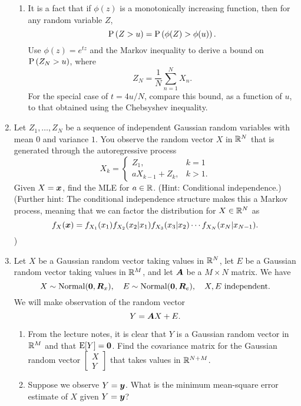 \documentclass[11pt]{article}
\begin{document}
\begin{enumerate}
\begin{enumerate}
	\item It is a fact that if $\phi(z)$ is a monotonically increasing function, then for any random variable $Z$,
	\[
		\P{Z > u} = \P{\phi(Z) >\phi(u)}. 
	\]
	Use $\phi(z) = e^{tz}$ and the Markov inequality to derive a bound on $\P{Z_N > u}$, where
	\[
		Z_N = \frac{1}{N}\sum_{n=1}^NX_n.
	\]
	For the special case of $t=4u/N$, compare this bound, as a function of $u$, to that obtained using the Chebsyshev inequality.
\end{enumerate}


\vspace{4mm}
\item Let $Z_1,\ldots,Z_N$ be a sequence of independent Gaussian random variables with mean $0$ and variance $1$.  You observe the random vector $X$ in $\R^N$ that is generated through the autoregressive process
\[
	X_k = \begin{cases} Z_1, &k=1 \\ aX_{k-1}+Z_k, &k > 1.\end{cases}
\]	
Given $X=\vx$, find the MLE for $a\in\R$.  (Hint: Conditional independence.)  (Further hint: The conditional independence structure makes this a Markov process, meaning that we can factor the distribution for $X\in\R^N$ as 
\[
	f_X(\vx) = f_{X_1}(x_1)f_{X_2}(x_2|x_1)f_{X_3}(x_3|x_2)\cdots f_{X_N}(x_N|x_{N-1}).
\]
)

\vspace{4mm} 
\item Let $X$ be a Gaussian random vector taking values in $\R^N$, let $E$ be a Gaussian random vector taking values in $\R^M$, and let $\mA$ be a $M\times N$ matrix.  We have
\[
	X\sim\mathrm{Normal}(\vzero,\mR_x),\quad
	E\sim\mathrm{Normal}(\vzero,\mR_e),\quad
	\text{$X,E$ independent}.
\]
We will make observation of the random vector
\[
	Y = \mA X + E.
\]
\begin{enumerate}

	\item From the lecture notes, it is clear that $Y$ is a Gaussian random vector in $\R^M$ and that $\E[Y]=\vzero$.  Find the covariance matrix for the Gaussian random vector $\begin{bmatrix} X \\ Y \end{bmatrix}$ that takes values in $\R^{N+M}$.
	
	\item Suppose we observe $Y=\vy$.  What is the minimum mean-square error estimate of $X$ given $Y=\vy$?
	

\end{enumerate}
\end{enumerate}
\end{document}
